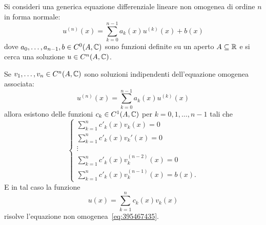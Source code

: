 \begin{theorem}
\mymark{***}%
Si consideri una generica equazione differenziale lineare non omogenea di ordine $n$ in forma normale:
\begin{equation}\label{eq:395467435}
  u^{(n)}(x) = \sum_{k=0}^{n-1} a_k(x) u^{(k)}(x) + b(x)
\end{equation}
dove $a_0, \dots, a_{n-1}, b\in C^0(A,{\mathbb C})$ sono funzioni definite su un aperto $A\subseteq {\mathbb R}$
e si cerca una soluzione $u\in C^n(A,{\mathbb C})$.

Se $v_1, \dots, v_n\in C^n(A,{\mathbb C})$ sono soluzioni indipendenti dell'equazione omogenea associata:
\begin{equation*}
  u^{(n)}(x) = \sum_{k=0}^{n-1} a_k(x) u^{(k)}(x)
\end{equation*}
allora
esistono delle funzioni $c_k\in C^1(A,{\mathbb C})$
per $k=0,1, \dots, n-1$
tali che
\begin{equation}\label{eq:02154676}
  \begin{cases}
    \sum_{k=1}^n c'_k(x) v_k(x) = 0 \\
    \sum_{k=1}^n c'_k(x) v_k'(x) = 0 \\
    \vdots\\
    \sum_{k=1}^n c'_k(x) v_k^{(n-2)}(x) = 0 \\
    \sum_{k=1}^n c'_k(x) v_k^{(n-1)}(x) = b(x).
  \end{cases}
\end{equation}
E in tal caso la funzione
\[
 u(x) = \sum_{k=1}^n c_k(x) v_k(x)
\]
risolve l'equazione non omogenea~\eqref{eq:395467435}.
\end{theorem}
%
